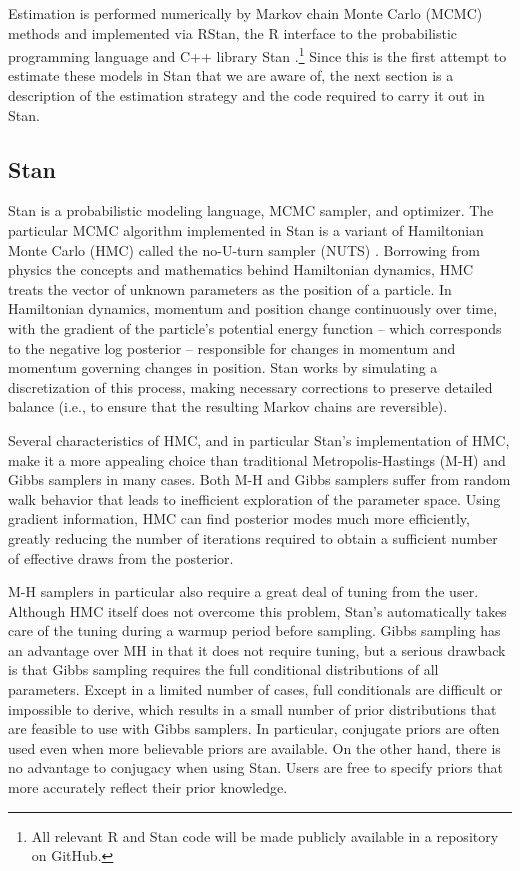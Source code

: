Estimation is performed numerically by Markov chain Monte Carlo (MCMC) methods and implemented via RStan, the R interface to the probabilistic programming language and C++ library Stan .\footnote{All relevant R and Stan code will be made publicly available in a repository on GitHub.} Since this is the first attempt to estimate these models in Stan that we are aware of, the next section is a description of the estimation strategy and the code required to carry it out in Stan.


\subsection{Stan} 

Stan is a probabilistic modeling language, MCMC sampler, and optimizer. The particular MCMC algorithm implemented in Stan is a variant of Hamiltonian Monte Carlo (HMC) called the no-U-turn sampler (NUTS) . Borrowing from physics the concepts and mathematics behind Hamiltonian dynamics, HMC treats the vector of unknown parameters as the position of a particle. In Hamiltonian dynamics, momentum and position change continuously over time, with the gradient of the particle's potential energy function --  which corresponds to the negative log posterior -- responsible for changes in momentum and momentum governing changes in position. Stan works by simulating a discretization of this process, making necessary corrections to preserve detailed balance (i.e., to ensure that the resulting Markov chains are reversible). 

Several characteristics of HMC, and in particular Stan's implementation of HMC, make it a more appealing choice than traditional Metropolis-Hastings (M-H) and Gibbs samplers in many cases. Both M-H and Gibbs samplers suffer from random walk behavior that leads to inefficient exploration of the parameter space. Using gradient information, HMC can find posterior modes much more efficiently, greatly reducing the number of iterations required to obtain a sufficient number of effective draws from the posterior. 

M-H samplers in particular also require a great deal of tuning from the user. Although HMC itself does not overcome this problem, Stan's automatically takes care of the tuning during a warmup period before sampling. Gibbs sampling has an advantage over MH in that it does not require tuning, but a serious drawback is that Gibbs sampling requires the full conditional distributions of all parameters. Except in a limited number of cases, full conditionals are difficult or impossible to derive, which results in a small number of prior distributions that are feasible to use with Gibbs samplers. In particular, conjugate priors are often used even when more believable priors are available. On the other hand, there is no advantage to conjugacy when using Stan. Users are free to specify priors that more accurately reflect their prior knowledge. 

